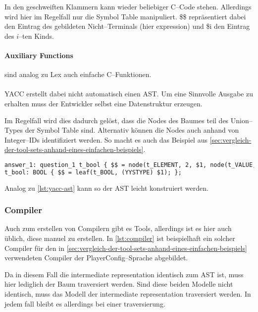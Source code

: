 In den geschweiften Klammern kann wieder beliebiger C--Code stehen.
Allerdings wird hier im Regelfall nur die Symbol Table manipuliert.
{\ttfamily \$\$} repräsentiert dabei den Eintrag des gebildeten Nicht--Terminals (hier {\ttfamily expression}) und {\ttfamily \$i} den Eintrag des $i$--ten Kinds.

\paragraph{Auxiliary Functions} sind analog zu Lex auch einfache C--Funktionen.

\paragraph*{}
\ac{YACC} erstellt dabei nicht automatisch einen \ac{AST}.
Um eine Sinnvolle Ausgabe zu erhalten muss der Entwickler selbst eine Datenstruktur erzeugen.

Im Regelfall wird dies dadurch gelöst, dass die Nodes des Baumes teil des Union--Types der Symbol Table sind.
Alternativ können die Nodes auch anhand von Integer--IDs identifiziert werden.
So macht es auch das Beispiel aus \autoref{sec:vergleich-der-tool-sets-anhand-eines-einfachen-beispiels}.
\begin{lstlisting}[label={lst:yacc-ast},caption={\acs{YACC} \acs{AST}},language=yacc]
answer_1: question_1 t_bool { $$ = node(t_ELEMENT, 2, $1, node(t_VALUE, 1, $2)); };
t_bool: BOOL { $$ = leaf(t_BOOL, (YYSTYPE) $1); };
\end{lstlisting}
Analog zu \autoref{lst:yacc-ast} kann so der \ac{AST} leicht konstruiert werden.

\subsubsection{Compiler}
Auch zum erstellen von Compilern gibt es Tools, allerdings ist es hier auch üblich, diese manuel zu erstellen.
In \autoref{lst:compiler} ist beispielhaft ein solcher Compiler für den in \autoref{sec:vergleich-der-tool-sets-anhand-eines-einfachen-beispiels} verwendeten Compiler der PlayerConfig--Sprache abgebildet.

Da in diesem Fall die intermediate representation identisch zum \ac{AST} ist, muss hier lediglich der Baum traversiert werden.
Sind diese beiden Modelle nicht identisch, muss das Modell der intermediate representation traversiert werden.
In jedem fall bleibt es allerdings bei einer traversierung.

